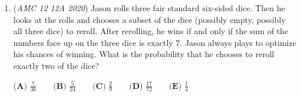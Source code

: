 \begin{enumerate}
 Aha! $\sum_{n=0}^\infty \left( \frac{5}{7} \right)^ne^{2i\theta n}$ is a geometric sequence that evaluates to $\frac{1}{1-\frac{5}{7}e^{2\theta i}}$! Now we can quickly see that 
 \[\sin(2\theta) = 2 \cdot \sin \theta \cdot \cos \theta = 2 \cdot \frac{2}{\sqrt{5}} \cdot \frac{1}{\sqrt{5}} = \frac{4}{5},\] 
 \[\cos (2\theta) = \cos^2 \theta - \sin^2 \theta = \frac{4}{5}-\frac{1}{5} = \frac{3}{5}.\] Therefore, 
 \[\frac{1}{1-\frac{5}{7}e^{2\theta i}} = \frac{1}{1 - \frac{5}{7}\left( \frac{3}{5} + \frac{4}{5}i\right)} = \frac{7}{8} + \frac{7}{8}i.\] The imaginary part is $\frac{7}{8}$, so our answer is $\frac{1}{2} \cdot \frac{7}{8} = \boxed{\frac{7}{16}} \Rightarrow \textbf{(B)}$.

 



\textbf{Solution 3}

Clearly $a_n=\frac{(2+i)^n+(2-i)^n}{2}, b_n=\frac{(2+i)^n-(2-i)^n}{2i}$. So we have $\sum_{n\ge 0}\frac{a_nb_n}{7^n}=\sum_{n\ge 0}\frac{((2+i)^n+(2-i)^n))((2+i)^n-(2-i)^n))}{4i(7^n)}$. By linearity, we have the latter is equivalent to $\frac{1}{4i}\sum_{n\ge 0}\frac{[(2+i)^n+(2-i)^n][(2+i)^n-(2-i)^n]}{7^n}$. Expanding the summand yields \begin{align*}\frac{1}{4i}\sum_{n\ge 0}\frac{(3+4i)^n-(3-4i)^n}{7^n}&=\frac{1}{4}[\frac{1}{1-(\frac{3+4i}{7})}-\frac{1}{1-(\frac{3-4i}{7})}] \\&=\frac{1}{4i}[\frac{7}{7-(3+4i)}-\frac{7}{7-(3-4i)}] \\&=\frac{1}{4}[\frac{7}{4-4i}-\frac{7}{4+4i}] \\&=\frac{1}{4i}[\frac{7(4+4i)}{32}-\frac{7(4-4i)}{32}]=\frac{1}{4}\cdot \frac{56}{32} \\&=\boxed{\frac{7}{16}}\textbf{(B)}\end{align*}
-vsamc

 


	\item (\textit{AMC 12 12A 2020}) Jason rolls three fair standard six-sided dice. Then he looks at the rolls and chooses a subset of the dice (possibly empty, possibly all three dice) to reroll. After rerolling, he wins if and only if the sum of the numbers face up on the three dice is exactly $7$. Jason always plays to optimize his chances of winning. What is the probability that he chooses to reroll exactly two of the dice?


 $\textbf{(A) } \frac{7}{36} \qquad\textbf{(B) } \frac{5}{24} \qquad\textbf{(C) } \frac{2}{9} \qquad\textbf{(D) } \frac{17}{72} \qquad\textbf{(E) } \frac{1}{4}$


\end{enumerate}
